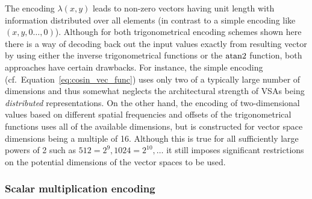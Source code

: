 The encoding $\lambda\left(x, y\right)$ leads to non-zero vectors having unit length with information distributed over all elements (in contrast to a simple encoding like $\left(x, y, 0 \ldots, 0\right)$).
Although for both trigonometrical encoding schemes shown here there is a way of decoding back out the input values exactly from resulting vector by using either the inverse trigonometrical functions or the $\operatorname{atan2}$ function, both approaches have certain drawbacks.
For instance, the simple encoding (cf.\ Equation~\eqref{eq:cosin_vec_func}) uses only two of a typically large number of dimensions and thus somewhat neglects the architectural strength of \acp{VSA} being \emph{distributed} representations.
On the other hand, the encoding of two-dimensional values based on different spatial frequencies and offsets of the trigonometrical functions uses all of the available dimensions, but is constructed for vector space dimensions being a multiple of \num{16}.
Although this is true for all sufficiently large powers of \num{2} such as $512=2^{9}, 1024=2^{10}, \ldots$ it still imposes significant restrictions on the potential dimensions of the vector spaces to be used.

\subsubsection{Scalar multiplication encoding}%
\label{ssubsec:scalar_multiplication_encoding}

